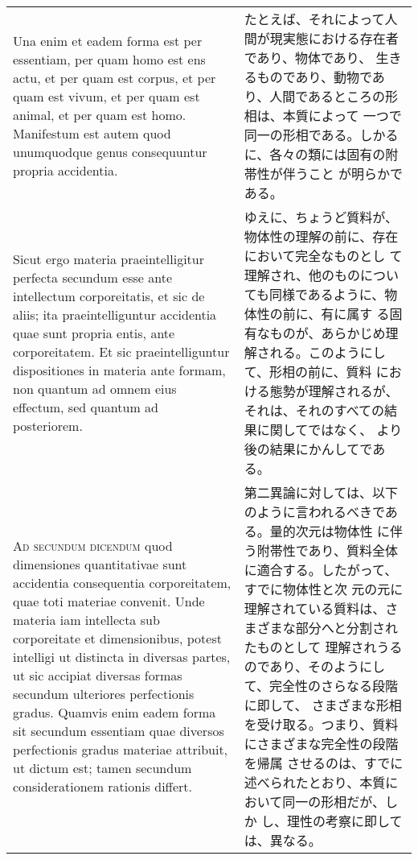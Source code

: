\documentclass[paper=a4paper,fontsize=10pt,jafontsize=9pt,titlepage]{jlreq}
\begin{document}
\begin{longtable}{p{21em}p{21em}}
\\

 Una enim et eadem forma est per essentiam, per
quam homo est ens actu, et per quam est corpus, et per quam est vivum,
et per quam est animal, et per quam est homo. Manifestum est autem
 quod unumquodque genus consequuntur propria accidentia.

 
&

 たとえば、それによって人間が現実態における存在者であり、物体であり、
 生きるものであり、動物であり、人間であるところの形相は、本質によって
 一つで同一の形相である。しかるに、各々の類には固有の附帯性が伴うこと
 が明らかである。
 
\\

 Sicut ergo materia praeintelligitur perfecta secundum esse ante
intellectum corporeitatis, et sic de aliis; ita praeintelliguntur
accidentia quae sunt propria entis, ante corporeitatem. Et sic
praeintelliguntur dispositiones in materia ante formam, non quantum ad
omnem eius effectum, sed quantum ad posteriorem.

&

ゆえに、ちょうど質料が、物体性の理解の前に、存在において完全なものとし
て理解され、他のものについても同様であるように、物体性の前に、有に属す
る固有なものが、あらかじめ理解される。このようにして、形相の前に、質料
における態勢が理解されるが、それは、それのすべての結果に関してではなく、
より後の結果にかんしてである。
 
\\

{\scshape Ad secundum dicendum} quod dimensiones quantitativae sunt
accidentia consequentia corporeitatem, quae toti materiae
convenit. Unde materia iam intellecta sub corporeitate et
dimensionibus, potest intelligi ut distincta in diversas partes, ut
sic accipiat diversas formas secundum ulteriores perfectionis
gradus. Quamvis enim eadem forma sit secundum essentiam quae diversos
perfectionis gradus materiae attribuit, ut dictum est; tamen secundum
considerationem rationis differt.

&

 第二異論に対しては、以下のように言われるべきである。量的次元は物体性
 に伴う附帯性であり、質料全体に適合する。したがって、すでに物体性と次
 元の元に理解されている質料は、さまざまな部分へと分割されたものとして
 理解されうるのであり、そのようにして、完全性のさらなる段階に即して、
 さまざまな形相を受け取る。つまり、質料にさまざまな完全性の段階を帰属
 させるのは、すでに述べられたとおり、本質において同一の形相だが、しか
 し、理性の考察に即しては、異なる。
 

\end{longtable}
\end{document}
